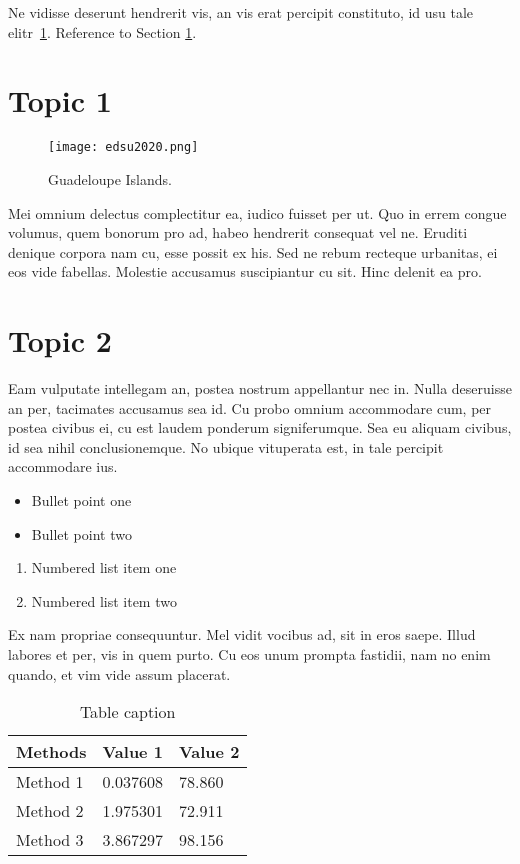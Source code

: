 \documentclass[letterpaper]{article}
\begin{document}
Ne vidisse deserunt hendrerit vis, an vis erat percipit constituto, id usu tale elitr~\ref{fig:first}. 
Reference to Section \ref{S:1}.

\section{Topic 1}
\label{S:1}

\begin{figure}[ht!]
\begin{center}
\texttt{[image: edsu2020.png]}
\end{center}
\caption{\label{fig:first} Guadeloupe Islands.}
\end{figure}


Mei omnium delectus complectitur ea, iudico fuisset per ut. Quo in errem congue volumus, quem bonorum pro ad, habeo hendrerit consequat vel ne. Eruditi denique corpora nam cu, esse possit ex his. Sed ne rebum recteque urbanitas, ei eos vide fabellas. Molestie accusamus suscipiantur cu sit. Hinc delenit ea pro.

\section{Topic 2}
\label{S:2}

Eam vulputate intellegam an, postea nostrum appellantur nec in. Nulla deseruisse an per, tacimates accusamus sea id. Cu probo omnium accommodare cum, per postea civibus ei, cu est laudem ponderum signiferumque. Sea eu aliquam civibus, id sea nihil conclusionemque. No ubique vituperata est, in tale percipit accommodare ius.

\begin{itemize}
\item Bullet point one
\item Bullet point two
\end{itemize}

\begin{enumerate}
\item Numbered list item one
\item Numbered list item two
\end{enumerate}

Ex nam propriae consequuntur. Mel vidit vocibus ad, sit in eros saepe. Illud labores et per, vis in quem purto. Cu eos unum prompta fastidii, nam no enim quando, et vim vide assum placerat.


\begin{table}[h]
\centering
\begin{tabular}{l l l}
\hline
\textbf{Methods} & \textbf{Value 1} & \textbf{Value 2}\\
\hline
Method 1 & 0.037608 & 78.860 \\
Method 2 & 1.975301 & 72.911 \\
Method 3 & 3.867297 & 98.156 \\
\hline
\end{tabular}
\caption{Table caption}
\end{table}
\end{document}
